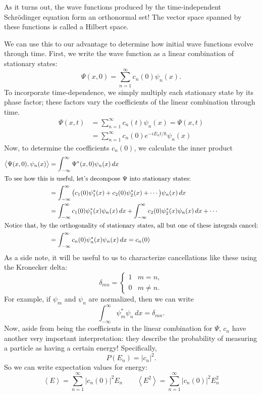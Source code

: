 \documentclass[../p052main.tex]{subfiles}
\begin{document}
As it turns out, the wave functions produced by the time-independent Schrödinger equation form an orthonormal set!
The vector space spanned by these functions is called a Hilbert space.

We can use this to our advantage to determine how initial wave functions evolve through time.
First, we write the wave function as a linear combination of stationary states:
\[ \Psi(x,0) = \sum_{n=1}^{\infty} c_n(0) \psi_n(x). \]
To incorporate time-dependence, we simply multiply each stationary state by its phase factor; these factors vary the coefficients of the linear combination through time.
\begin{align*}
    \Psi(x,t) &= \sum_{n=1}^{\infty} c_n(t) \psi_n(x) = \Psi(x,t) \\
    &= \sum_{n=1}^{\infty} c_n(0) e^{-iE_nt/\hbar} \psi_n(x)
\end{align*}
Now, to determine the coefficients $c_n(0)$, we calculate the inner product
\begin{align*}
    \big< \Psi(x,0), \psi_n(x) \big> &= \int_{-\infty}^{\infty} \Psi^*(x,0)\psi_n(x) \,dx \\
    \intertext{To see how this is useful, let's decompose $\Psi$ into stationary states:}
    &= \int_{-\infty}^{\infty} \big( c_1(0) \psi_1^*(x) + c_2(0) \psi_2^*(x) + \cdots \big) \psi_n(x) \,dx \\
    &= \int_{-\infty}^{\infty} c_1(0)\psi_1^*(x)\psi_n(x) \,dx + \int_{-\infty}^{\infty} c_2(0)\psi_2^*(x)\psi_n(x) \,dx + \cdots \\
    \intertext{Notice that, by the orthogonality of stationary states, all but one of these integrals cancel:}
    &= \int_{-\infty}^{\infty} c_n(0) \psi_n^*(x) \psi_n(x) \,dx = c_n(0)
\end{align*}
As a side note, it will be useful to us to characterize cancellations like these using the Kronecker delta:
\[ \delta_{mn} = \begin{cases} 1 & m = n, \\ 0 & m \neq n. \end{cases} \]
For example, if $\psi_m$ and $\psi_n$ are normalized, then we can write
\[ \int_{-\infty}^{\infty} \psi_m^*\psi_n \,dx = \delta_{mn}. \]
Now, aside from being the coefficients in the linear combination for $\Psi$, $c_n$ have another very important interpretation: they describe the probability of measuring a particle as having a certain energy!
Specifically,
\[ P(E_n) = |c_n|^2. \]
So we can write expectation values for energy:
\[ \left< E \right> = \sum_{n=1}^{\infty} |c_n(0)|^2 E_n \qquad \left< E^2 \right> = \sum_{n=1}^{\infty} |c_n(0)|^2 E_n^2 \]
\end{document}
